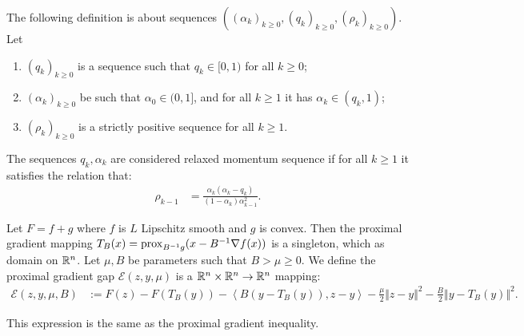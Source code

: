 \documentclass[12pt]{article}
\begin{document}
    \begin{definition}\label{def:rlx-momentum-seq}
        The following definition is about sequences $((\alpha_k)_{k \ge 0}, (q_k)_{k \ge 0}, (\rho_k)_{k \ge 0})$. 
        Let 
        \begin{enumerate}[nosep]
            \item $(q_k)_{k \ge 0}$ is a sequence such that $q_k \in [0, 1)$ for all $k \ge 0$;
            \item $(\alpha_k)_{k \ge 0}$ be such that $\alpha_0 \in (0, 1]$, and for all $k \ge 1$ it has $\alpha_k \in (q_k, 1)$;
            \item $(\rho_k)_{k \ge 0}$ is a strictly positive sequence for all $k \ge 1$. 
        \end{enumerate}
        The sequences $q_k, \alpha_k$ are considered relaxed momentum sequence if for all $k \ge 1$ it satisfies the relation that: 
        \begin{align*}
            \rho_{k - 1} &= \frac{\alpha_k(\alpha_k - q_k)}{(1 - \alpha_{k})\alpha_{k - 1}^2}. 
        \end{align*}
    \end{definition}
    \begin{definition}\label{def:pg-gap}
        Let $F = f + g$ where $f$ is $L$ Lipschitz smooth and $g$ is convex. 
        Then the proximal gradient mapping $T_B(x) = \operatorname{prox}_{B^{-1}g}(x -  B^{-1}\nabla f(x))$ is a singleton, which as domain on $\mathbb R^n$. 
        Let $\mu, B$ be parameters such that $B > \mu \ge 0$. 
        We define the proximal gradient gap $\mathcal E(z, y, \mu)$ is a $\mathbb R^n \times \mathbb R^n \rightarrow \mathbb R^n$ mapping: 
        \begin{align*}
            \mathcal E(z, y, \mu, B) &:= 
            F(z) - F(T_B(y)) 
            - \left\langle B(y - T_B(y)), z - y\right\rangle
            - \frac{\mu}{2}\Vert z - y\Vert^2
            - \frac{B}{2}\Vert y - T_B(y)\Vert^2. 
        \end{align*}
    \end{definition}
    \begin{remark}
        This expression is the same as the proximal gradient inequality. 
    \end{remark}
    
\end{document}
